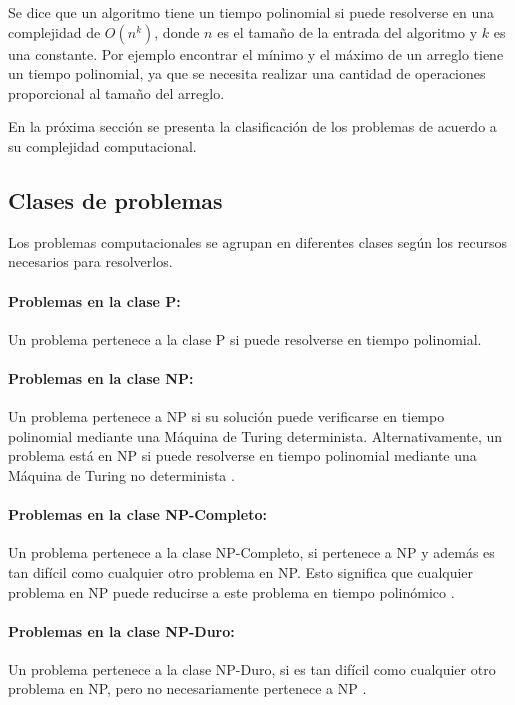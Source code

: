 \documentclass[12pt]{article}
\begin{document}
Se dice que un algoritmo tiene un tiempo polinomial si puede resolverse en una complejidad de $O(n^k)$, donde $n$ es el tamaño de la entrada del algoritmo y $k$
es una constante. Por ejemplo encontrar el mínimo y el máximo de un arreglo tiene un tiempo polinomial, ya que se necesita realizar una cantidad de operaciones
proporcional al tamaño del arreglo.


En la próxima sección se presenta la clasificación de los problemas de acuerdo a su complejidad computacional.
\subsection{Clases de problemas}

Los problemas computacionales \cite{authomataTheory} se agrupan en diferentes clases según los recursos necesarios para resolverlos.

\paragraph{Problemas en la clase P:}
Un problema pertenece a la clase P si puede resolverse en tiempo polinomial.

\paragraph{Problemas en la clase NP:}
Un problema pertenece a NP si su solución puede verificarse en tiempo polinomial mediante una Máquina de Turing determinista. Alternativamente, un problema está en NP si puede resolverse en tiempo polinomial mediante una Máquina de Turing no determinista \cite{authomataTheory}.

\paragraph{Problemas en la clase NP-Completo:}
Un problema pertenece a la clase NP-Completo, si pertenece a NP y además es tan difícil como cualquier otro problema en NP. Esto significa que cualquier problema en NP puede reducirse a este problema en tiempo polinómico \cite{authomataTheory}.

\paragraph{Problemas en la clase NP-Duro:}
Un problema pertenece a la clase NP-Duro, si es tan difícil como cualquier otro problema en NP, pero no
necesariamente pertenece a NP \cite{authomataTheory}.
\end{document}

